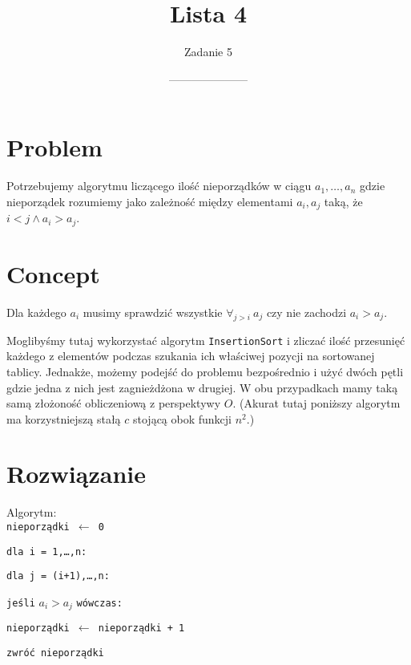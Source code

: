 \documentclass[14pt]{article}
\title{Lista 4}
\author{Zadanie 5}
\date{---------------------}
\begin{document}
\maketitle

\section{Problem}

Potrzebujemy algorytmu liczącego ilość nieporządków w ciągu $a_1, \dots, a_n$ gdzie nieporządek rozumiemy jako zależność między elementami $a_i, a_j$ taką, że $i < j \land a_i > a_j$.

\section{Concept}

Dla każdego $a_i$ musimy sprawdzić wszystkie $\forall_{j > i} ~a_j$ czy nie zachodzi $a_i > a_j$.

Moglibyśmy tutaj wykorzystać algorytm \texttt{InsertionSort} i zliczać ilość przesunięć każdego z elementów podczas szukania ich właściwej pozycji na sortowanej tablicy. Jednakże, możemy podejść do problemu bezpośrednio i użyć dwóch pętli gdzie jedna z nich jest zagnieżdżona w drugiej.
W obu przypadkach mamy taką samą złożoność obliczeniową z perspektywy $O$. (Akurat tutaj poniższy algorytm ma korzystniejszą stałą $c$ stojącą obok funkcji $n^2$.)

\section{Rozwiązanie}

Algorytm:\\
\indent \texttt{nieporządki $\leftarrow$ 0}

\indent \texttt{dla i = 1,\dots,n:}

\indent\indent \texttt{dla j = (i+1),\dots,n:}

\indent\indent\indent \texttt{jeśli} $a_i > a_j$ \texttt{wówczas:}

\indent\indent\indent\indent \texttt{nieporządki $\leftarrow$ nieporządki + 1}

\indent \texttt{zwróć nieporządki}
\end{document}
